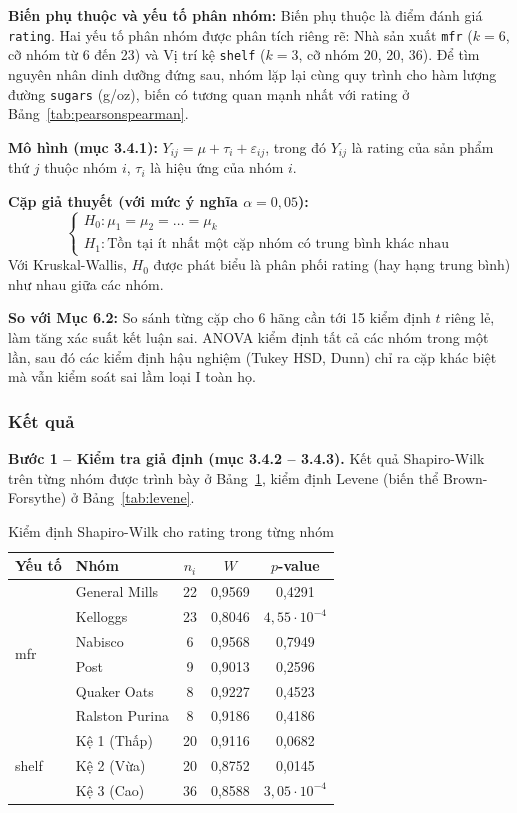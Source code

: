 \documentclass[12pt,a4paper]{article}
\begin{document}
\textbf{Biến phụ thuộc và yếu tố phân nhóm:} Biến phụ thuộc là điểm đánh giá
\texttt{rating}. Hai yếu tố phân nhóm được phân tích riêng rẽ: Nhà sản xuất \texttt{mfr}
($k = 6$, cỡ nhóm từ 6 đến 23) và Vị trí kệ \texttt{shelf} ($k = 3$, cỡ nhóm 20, 20, 36). Để
tìm nguyên nhân dinh dưỡng đứng sau, nhóm lặp lại cùng quy trình cho hàm lượng đường
\texttt{sugars} (g/oz), biến có tương quan mạnh nhất với rating ở Bảng~\ref{tab:pearsonspearman}.

\textbf{Mô hình (mục 3.4.1):} $Y_{ij} = \mu + \tau_i + \varepsilon_{ij}$, trong đó
$Y_{ij}$ là rating của sản phẩm thứ $j$ thuộc nhóm $i$, $\tau_i$ là hiệu ứng của nhóm $i$.

\textbf{Cặp giả thuyết (với mức ý nghĩa $\alpha = 0{,}05$):}
\begin{equation}
\begin{cases}
H_0: \mu_1 = \mu_2 = \dots = \mu_k\\
H_1: \text{Tồn tại ít nhất một cặp nhóm có trung bình khác nhau}
\end{cases}
\end{equation}
Với Kruskal-Wallis, $H_0$ được phát biểu là phân phối rating (hay hạng trung bình) như nhau
giữa các nhóm.

\textbf{So với Mục 6.2:} So sánh từng cặp cho 6 hãng cần tới 15 kiểm định $t$ riêng lẻ,
làm tăng xác suất kết luận sai. ANOVA kiểm định tất cả các nhóm trong một lần, sau đó các
kiểm định hậu nghiệm (Tukey HSD, Dunn) chỉ ra cặp khác biệt mà vẫn kiểm soát sai lầm loại I
toàn họ.

\subsubsection{Kết quả}

\textbf{Bước 1 -- Kiểm tra giả định (mục 3.4.2 -- 3.4.3).} Kết quả Shapiro-Wilk trên từng nhóm
được trình bày ở Bảng~\ref{tab:shapiro}, kiểm định Levene (biến thể Brown-Forsythe) ở
Bảng~\ref{tab:levene}.

\begin{table}[H]
\centering
\caption{Kiểm định Shapiro-Wilk cho rating trong từng nhóm}
\label{tab:shapiro}
\begin{tabular}{l l c c c}
\toprule
Yếu tố & Nhóm & $n_i$ & $W$ & $p$-value \\
\midrule
\multirow{6}{*}{mfr}
  & General Mills  & 22 & 0,9569 & 0,4291 \\
  & Kelloggs       & 23 & 0,8046 & $4{,}55\cdot10^{-4}$ \\
  & Nabisco        & 6  & 0,9568 & 0,7949 \\
  & Post           & 9  & 0,9013 & 0,2596 \\
  & Quaker Oats    & 8  & 0,9227 & 0,4523 \\
  & Ralston Purina & 8  & 0,9186 & 0,4186 \\
\midrule
\multirow{3}{*}{shelf}
  & Kệ 1 (Thấp) & 20 & 0,9116 & 0,0682 \\
  & Kệ 2 (Vừa)  & 20 & 0,8752 & 0,0145 \\
  & Kệ 3 (Cao)  & 36 & 0,8588 & $3{,}05\cdot10^{-4}$ \\
\bottomrule
\end{tabular}
\end{table}
\end{document}
